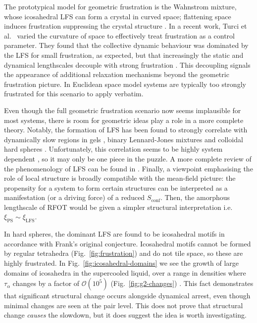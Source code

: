 \documentclass[11pt,twoside]{report}
\begin{document}
The prototypical model for geometric frustration is the Wahnstrom mixture, whose icosahedral LFS can form a crystal in curved space; flattening space induces frustration suppressing the crystal structure \cite{CharbonneauPRL2012,RoyallPR2015}.
In a recent work, Turci et al.\ \cite{TurciPRL2017} varied the curvature of space to effectively treat frustration as a control parameter.
They found that the collective dynamic behaviour was dominated by the LFS for small frustration, as expected, but that increasingly the static and dynamical lengthscales decouple with strong frustration \cite{TurciPRL2017}.
This decoupling signals the appearance of additional relaxation mechanisms beyond the geometric frustration picture.
In Euclidean space model systems are typically too strongly frustrated for this scenario to apply verbatim.

Even though the full geometric frustration scenario now seems implausible for most systems, there is room for geometric ideas play a role in a more complete theory.
Notably, the formation of LFS has been found to strongly correlate with dynamically slow regions in gels \cite{RoyallNM2008}, binary Lennard-Jones mixtures \cite{CoslovichJCP2007,CoslovichJCP2007a} and colloidal hard spheres \cite{LeocmachNC2012}.
Unfortunately, this correlation seems to be highly system dependent \cite{HockyPRL2014}, so it may only be one piece in the puzzle.
A more complete review of the phenomenology of LFS can be found in \cite{RoyallPR2015}.
Finally, a viewpoint emphasising the role of local structure is broadly compatible with the mean-field picture: the propensity for a system to form certain structures can be interpreted as a manifestation (or a driving force) of a reduced $S_\mathrm{conf}$.
Then, the amorphous lengthscale of RFOT would be given a simpler structural interpretation i.e.\ $\xi_\mathrm{PS} \sim \xi_\mathrm{LFS}$.


In hard spheres, the dominant LFS are found to be icosahedral motifs in accordance with Frank's original conjecture.
Icosahedral motifs cannot be formed by regular tetrahedra  (Fig.\ \ref{fig:frustration}) and do not tile space, so these are highly frustrated.
In Fig.\ \ref{fig:icosahedral-domains} we see the growth of large domains of icosahedra in the supercooled liquid, over a range in densities where $\tau_\alpha$ changes by a factor of $\mathcal{O}(10^5)$ (Fig.\ \ref{fig:g2-changes}) \cite{HallettNC2018}.
This fact demonstrates that significant structural change occurs alongside dynamical arrest, even though minimal changes are seen at the pair level.
This does not prove that structural change \emph{causes} the slowdown, but it does suggest the idea is worth investigating.
\end{document}
